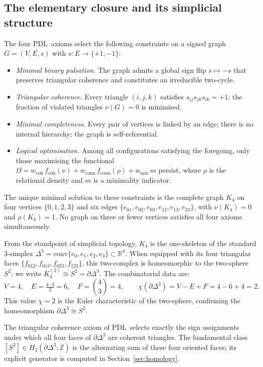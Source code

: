 \documentclass[11pt,a4paper]{article}
\theoremstyle{definition}
\newcommand{\PDL}{\textnormal{PDL}}
\newcommand{\Kfour}{K_4}
\newcommand{\Sfour}{\partial\Delta^3}
\newcommand{\Hk}[1]{H_{#1}}
\begin{document}
\subsection{The elementary closure and its simplicial structure}
\label{subsec:K4}

The four \PDL\ axioms select the following constraints on a signed graph $G = (V, E, s)$ with $s : E \to \{+1, -1\}$:\cite{PDL_Main_2026}
\begin{itemize}
  \item \emph{Minimal binary pulsation.} The graph admits a global sign flip $s \mapsto -s$ that preserves triangular coherence and constitutes an irreducible two-cycle.
  \item \emph{Triangular coherence.} Every triangle $(i,j,k)$ satisfies $s_{ij}s_{jk}s_{ik} = +1$; the fraction of violated triangles $\nu(G) = 0$ is minimised.
  \item \emph{Minimal completeness.} Every pair of vertices is linked by an edge; there is no internal hierarchy; the graph is self-referential.
  \item \emph{Logical optimisation.} Among all configurations satisfying the foregoing, only those maximising the functional $\Omega = w_{\mathrm{coh}}\,f_{\mathrm{coh}}(\nu) + w_{\mathrm{conn}}\,f_{\mathrm{conn}}(\rho) + w_{\min}\,m$ persist, where $\rho$ is the relational density and $m$ is a minimality indicator.
\end{itemize}
The unique minimal solution to these constraints is the complete graph $\Kfour$ on four vertices $\{0,1,2,3\}$ and six edges $\{e_{01}, e_{02}, e_{03}, e_{12}, e_{13}, e_{23}\}$, with $\nu(\Kfour) = 0$ and $\rho(\Kfour) = 1$.\cite{PDL_Main_2026} No graph on three or fewer vertices satisfies all four axioms simultaneously.

From the standpoint of simplicial topology, $\Kfour$ is the one-skeleton of the standard $3$-simplex $\Delta^3 = \mathrm{conv}\{e_0, e_1, e_2, e_3\} \subset \mathbb{R}^4$. When equipped with its four triangular faces $\{f_{012}, f_{013}, f_{023}, f_{123}\}$, this two-complex is homeomorphic to the two-sphere $S^2$: we write $\Kfour^{(2)} \cong S^2 = \Sfour$. The combinatorial data are:
\[
  V = 4, \quad E = \tfrac{4 \cdot 3}{2} = 6, \quad F = \binom{4}{3} = 4,
  \qquad \chi(\Sfour) = V - E + F = 4 - 6 + 4 = 2.
\]
This value $\chi = 2$ is the Euler characteristic of the two-sphere, confirming the homeomorphism $\Sfour \cong S^2$.

The triangular coherence axiom of \PDL\ selects exactly the sign assignments under which all four faces of $\Sfour$ are coherent triangles. The fundamental class $[S^2] \in \Hk{2}(\Sfour;\mathbb{Z})$ is the alternating sum of these four oriented faces; its explicit generator is computed in Section~\ref{sec:homology}.
\end{document}
